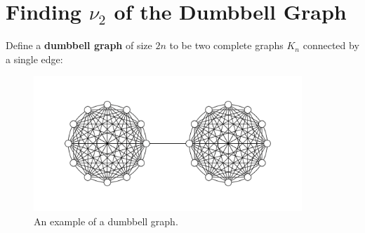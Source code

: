 \documentclass[11pt]{article}
\begin{document}
\newcommand{\coursenum}{{CSC 2421H}}
\newcommand{\coursename}{{Graphs, Matrices, and Optimization}}
\newcommand{\courseprof}{Sushant Sachdeva}

\section{Finding $\nu_2$ of the Dumbbell Graph}
\begin{definition}
  Define a \textbf{dumbbell graph} of size $2n$ to be two complete graphs $K_n$
  connected by a single edge: 

  \begin{figure}[ht]
    \centering
    \includegraphics[width=0.9\textwidth]{images/dumbbell_graph.png}
    \caption{An example of a dumbbell graph.\label{dumbbell_graph}}
  \end{figure}

\end{definition}
\end{document}
